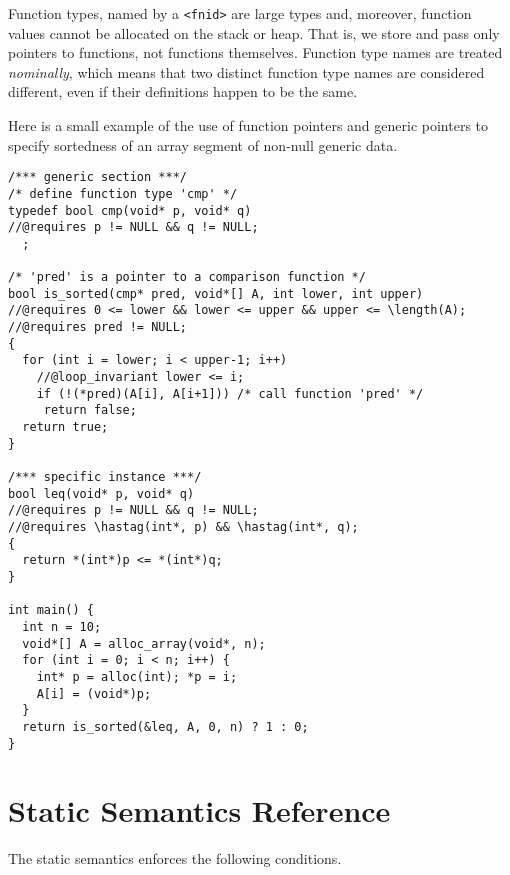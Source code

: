 \documentclass[11pt]{article}
\begin{document}
Function types, named by a \lstinline'<fnid>' are large types and, moreover,
function values cannot be allocated on the stack or heap.  That is, we
store and pass only pointers to functions, not functions themselves.
Function type names are treated \emph{nominally}, which means that two
distinct function type names are considered different, even if their
definitions happen to be the same.

Here is a small example of the use of function pointers and generic
pointers to specify sortedness of an array segment of non-null generic
data.
\begin{lstlisting}
/*** generic section ***/
/* define function type 'cmp' */
typedef bool cmp(void* p, void* q)
//@requires p != NULL && q != NULL;
  ;

/* 'pred' is a pointer to a comparison function */
bool is_sorted(cmp* pred, void*[] A, int lower, int upper)
//@requires 0 <= lower && lower <= upper && upper <= \length(A);
//@requires pred != NULL;
{
  for (int i = lower; i < upper-1; i++)
    //@loop_invariant lower <= i;
    if (!(*pred)(A[i], A[i+1])) /* call function 'pred' */
     return false;
  return true;
}

/*** specific instance ***/
bool leq(void* p, void* q)
//@requires p != NULL && q != NULL;
//@requires \hastag(int*, p) && \hastag(int*, q);
{
  return *(int*)p <= *(int*)q;
}

int main() {
  int n = 10;
  void*[] A = alloc_array(void*, n);
  for (int i = 0; i < n; i++) {
    int* p = alloc(int); *p = i;
    A[i] = (void*)p;
  }
  return is_sorted(&leq, A, 0, n) ? 1 : 0;
}
\end{lstlisting}

\clearpage
\section{Static Semantics Reference}

The static semantics enforces the following conditions.
\end{document}
